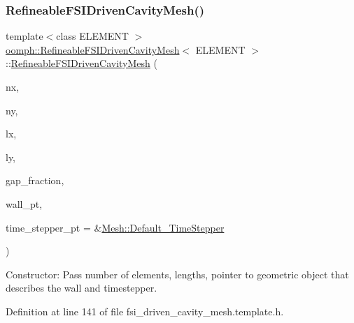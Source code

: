 \subsubsection{\texorpdfstring{Refineable\+F\+S\+I\+Driven\+Cavity\+Mesh()}{RefineableFSIDrivenCavityMesh()}}
{\footnotesize\ttfamily template$<$class E\+L\+E\+M\+E\+NT $>$ \\
\hyperlink{classoomph_1_1RefineableFSIDrivenCavityMesh}{oomph\+::\+Refineable\+F\+S\+I\+Driven\+Cavity\+Mesh}$<$ E\+L\+E\+M\+E\+NT $>$\+::\hyperlink{classoomph_1_1RefineableFSIDrivenCavityMesh}{Refineable\+F\+S\+I\+Driven\+Cavity\+Mesh} (\begin{DoxyParamCaption}\item[{const unsigned \&}]{nx,  }\item[{const unsigned \&}]{ny,  }\item[{const double \&}]{lx,  }\item[{const double \&}]{ly,  }\item[{const double \&}]{gap\+\_\+fraction,  }\item[{\hyperlink{classoomph_1_1GeomObject}{Geom\+Object} $\ast$}]{wall\+\_\+pt,  }\item[{\hyperlink{classoomph_1_1TimeStepper}{Time\+Stepper} $\ast$}]{time\+\_\+stepper\+\_\+pt = {\ttfamily \&\hyperlink{classoomph_1_1Mesh_a12243d0fee2b1fcee729ee5a4777ea10}{Mesh\+::\+Default\+\_\+\+Time\+Stepper}} }\end{DoxyParamCaption})\hspace{0.3cm}{\ttfamily [inline]}}



Constructor\+: Pass number of elements, lengths, pointer to geometric object that describes the wall and timestepper. 



Definition at line 141 of file fsi\+\_\+driven\+\_\+cavity\+\_\+mesh.\+template.\+h.

\mbox{\label{classoomph_1_1RefineableFSIDrivenCavityMesh_a01e9f73b3d9344b6df2aeda2c57de628}} 
